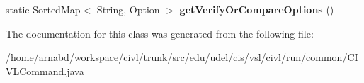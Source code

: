 \begin{DoxyCompactItemize}
\item 
\hypertarget{classedu_1_1udel_1_1cis_1_1vsl_1_1civl_1_1run_1_1common_1_1CIVLCommand_aefbea2bdca58e180b367d68390063f93}{}static Sorted\+Map$<$ String, Option $>$ {\bfseries get\+Verify\+Or\+Compare\+Options} ()\label{classedu_1_1udel_1_1cis_1_1vsl_1_1civl_1_1run_1_1common_1_1CIVLCommand_aefbea2bdca58e180b367d68390063f93}

\end{DoxyCompactItemize}


The documentation for this class was generated from the following file\+:\begin{DoxyCompactItemize}
\item 
/home/arnabd/workspace/civl/trunk/src/edu/udel/cis/vsl/civl/run/common/C\+I\+V\+L\+Command.\+java\end{DoxyCompactItemize}
